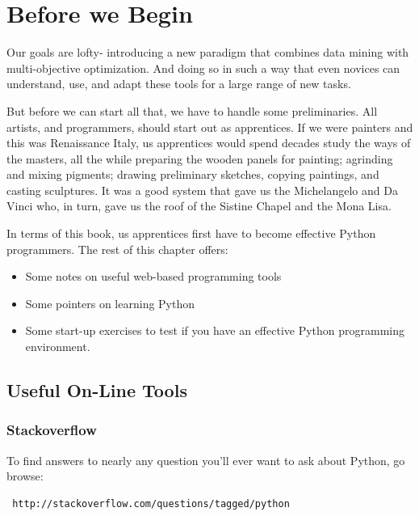 \section{Before we Begin}\label{before-we-begin}

Our goals are lofty- introducing a new paradigm that combines data
mining with multi-objective optimization. And doing so in such a way
that even novices can understand, use, and adapt these tools for a large
range of new tasks.

But before we can start all that, we have to handle some preliminaries.
All artists, and programmers, should start out as apprentices. If we
were painters and this was Renaissance Italy, us apprentices would spend
decades study the ways of the masters, all the while preparing the
wooden panels for painting; agrinding and mixing pigments; drawing
preliminary sketches, copying paintings, and casting sculptures. It was
a good system that gave us the Michelangelo and Da Vinci who, in turn,
gave us the roof of the Sistine Chapel and the Mona Lisa.

In terms of this book, us apprentices first have to become effective
Python programmers. The rest of this chapter offers:

\begin{itemize}
\itemsep1pt\parskip0pt
\item
  Some notes on useful web-based programming tools
\item
  Some pointers on learning Python
\item
  Some start-up exercises to test if you have an effective Python
  programming environment.
\end{itemize}

\subsection{Useful On-Line Tools}\label{useful-on-line-tools}

\subsubsection{Stackoverflow}\label{stackoverflow}

To find answers to nearly any question you'll ever want to ask about
Python, go browse:

\begin{lstlisting}
 http://stackoverflow.com/questions/tagged/python
\end{lstlisting}


